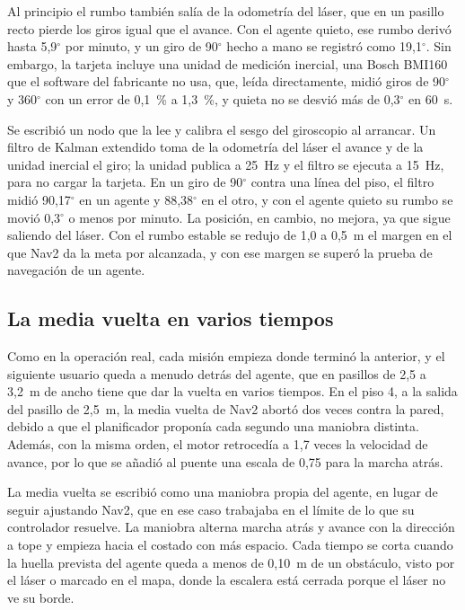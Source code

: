 Al principio el rumbo también salía de la odometría del láser, que en un pasillo recto pierde los giros igual que el avance. Con el agente quieto, ese rumbo derivó hasta 5,9$^\circ$ por minuto,
y un giro de 90$^\circ$ hecho a mano se registró como 19,1$^\circ$. Sin embargo, la tarjeta incluye una unidad de medición inercial, una Bosch BMI160 que el software del fabricante no usa, que,
leída directamente, midió giros de 90$^\circ$ y 360$^\circ$ con un error de 0,1~\% a 1,3~\%, y quieta no se desvió más de 0,3$^\circ$ en 60~s.

Se escribió un nodo que la lee y calibra el sesgo del giroscopio al arrancar. Un filtro de Kalman extendido toma de la odometría del láser el avance y de la unidad inercial el giro; la unidad
publica a 25~Hz y el filtro se ejecuta a 15~Hz, para no cargar la tarjeta. En un giro de 90$^\circ$ contra una línea del piso, el filtro midió 90,17$^\circ$ en un agente y 88,38$^\circ$ en el otro, y
con el agente quieto su rumbo se movió 0,3$^\circ$ o menos por minuto. La posición, en cambio, no mejora, ya que sigue saliendo del láser. Con el rumbo estable se redujo de 1,0 a 0,5~m el margen en
el que Nav2 da la meta por alcanzada, y con ese margen se superó la prueba de navegación de un agente.

\subsection{La media vuelta en varios tiempos}
\label{sec:media-vuelta}

Como en la operación real, cada misión empieza donde terminó la anterior, y el siguiente usuario queda a menudo detrás del agente, que en pasillos de 2,5 a 3,2~m de ancho tiene que dar la vuelta en varios
tiempos. En el piso 4, a la salida del pasillo de 2,5~m, la media vuelta de Nav2 abortó dos veces contra la pared, debido a que el planificador proponía cada segundo una maniobra distinta. Además, con la misma
orden, el motor retrocedía a 1,7 veces la velocidad de avance, por lo que se añadió al puente una escala de 0,75 para la marcha atrás.

La media vuelta se escribió como una maniobra propia del agente, en lugar de seguir ajustando Nav2, que en ese caso trabajaba en el límite de lo que su controlador resuelve. La maniobra alterna marcha atrás y
avance con la dirección a tope y empieza hacia el costado con más espacio. Cada tiempo se corta cuando la huella prevista del agente queda a menos de 0,10~m de un obstáculo, visto por el láser o marcado en el
mapa, donde la escalera está cerrada porque el láser no ve su borde.

